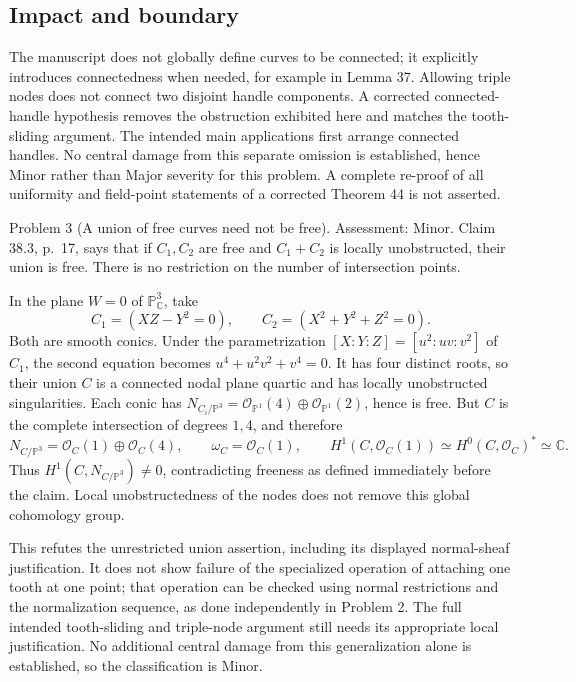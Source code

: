 \documentclass[10pt]{article}
\begin{document}
\subsection*{Impact and boundary}
The manuscript does not globally define curves to be connected; it explicitly introduces connectedness when needed, for example in Lemma 37. Allowing triple nodes does not connect two disjoint handle components. A corrected connected-handle hypothesis removes the obstruction exhibited here and matches the tooth-sliding argument. The intended main applications first arrange connected handles. No central damage from this separate omission is established, hence Minor rather than Major severity for this problem. A complete re-proof of all uniformity and field-point statements of a corrected Theorem 44 is not asserted.\par
Problem 3 (A union of free curves need not be free).  Assessment: Minor. Claim 38.3, p. 17, says that if \(C_1,C_2\) are free and \(C_1+C_2\) is locally unobstructed, their union is free. There is no restriction on the number of intersection points.\par
In the plane \(W=0\) of \(\mathbb P^3_{\mathbb C}\), take \[C_1=(XZ-Y^2=0),\qquad C_2=(X^2+Y^2+Z^2=0).\] Both are smooth conics. Under the parametrization \([X:Y:Z]=[u^2:uv:v^2]\) of \(C_1\), the second equation becomes \(u^4+u^2v^2+v^4=0\). It has four distinct roots, so their union \(C\) is a connected nodal plane quartic and has locally unobstructed singularities. Each conic has \(N_{C_i/\mathbb P^3}=\mathcal O_{\mathbb P^1}(4)\oplus\mathcal O_{\mathbb P^1}(2)\), hence is free. But \(C\) is the complete intersection of degrees \(1,4\), and therefore \[N_{C/\mathbb P^3}=\mathcal O_C(1)\oplus\mathcal O_C(4),\qquad
 \omega_C=\mathcal O_C(1),\qquad
 H^1(C,\mathcal O_C(1))\simeq H^0(C,\mathcal O_C)^*\simeq\mathbb C.\] Thus \(H^1(C,N_{C/\mathbb P^3})\ne0\), contradicting freeness as defined immediately before the claim. Local unobstructedness of the nodes does not remove this global cohomology group.\par
This refutes the unrestricted union assertion, including its displayed normal-sheaf justification. It does not show failure of the specialized operation of attaching one tooth at one point; that operation can be checked using normal restrictions and the normalization sequence, as done independently in Problem 2. The full intended tooth-sliding and triple-node argument still needs its appropriate local justification. No additional central damage from this generalization alone is established, so the classification is Minor.\par
\end{document}
